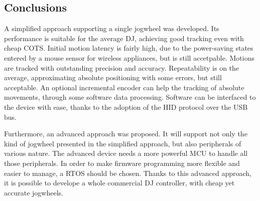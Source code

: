 \documentclass[a4paper,10pt]{article}
\begin{document}
\begin{multicols}{2}
\section{Conclusions}
\label{sec:conclusions}

A simplified approach supporting a single jogwheel was developed. Its
performance is suitable for the average DJ, achieving good tracking even with
cheap COTS. Initial motion latency is fairly high, due to the power-saving
states entered by a mouse sensor for wireless appliances, but is still
accetpable. Motions are tracked with outstanding precision and accuracy.
Repeatability is on the average, approximating absolute positioning with some
errors, but still acceptable. An optional incremental encoder can help the
tracking of absolute movements, through some software data processing.
Software can be interfaced to the device with ease, thanks to the adoption of
the HID protocol over the USB bus.

Furthermore, an advanced approach was proposed. It will support not only the
kind of jogwheel presented in the simplified approach, but also peripherals of
various nature. The advanced device needs a more powerful MCU to handle all
those peripherals. In order to make firmware programming more flexible and
easier to manage, a RTOS should be chosen. Thanks to this advanced approach,
it is possible to develope a whole commercial DJ controller, with cheap yet
accurate jogwheels.





\end{multicols}
\end{document}
